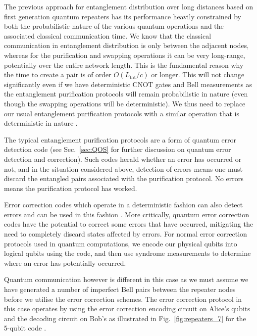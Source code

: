 \documentclass[twocolumn, aps, rmp, amsmath, amssymb, nofootinbib, superscriptaddress, longbibliography, floatfix, table-of-contents, eqsecnum]{revtex4-1}
\begin{document}
The previous approach for entanglement distribution over long distances based on first generation quantum repeaters has its performance heavily constrained by both the probabilistic nature of the various quantum operations and the associated classical communication time. We know that the classical communication in entanglement distribution is only between the adjacent nodes, whereas for the purification and swapping operations it can be very long-range, potentially over the entire network length. This is the fundamental reason why the time to create a pair is of order $O(L_\mathrm{tot}/c)$ or longer. This will not change significantly even if we have deterministic CNOT gates and Bell measurements as the entanglement purification protocols will remain probabilistic in nature (even though the swapping operations will be deterministic). We thus need to replace our usual entanglement purification protocols with a similar operation that is deterministic in nature \cite{bib:jiang09, bib:munro10}.

The typical entanglement purification protocols are a form of quantum error detection code \cite{bib:WJM2015, bib:devitt2013} (see Sec.~\ref{sec:QOS} for further discussion on quantum error detection and correction). Such codes herald whether an error has occurred or not, and in the situation considered above, detection of errors means one must discard the entangled pairs associated with the purification protocol. No errors means the purification protocol has worked.

Error correction codes which operate in a deterministic fashion can also detect errors and can be used in this fashion \cite{bib:jiang09, bib:munro10}. More critically, quantum error correction codes have the potential to correct some errors that have occurred, mitigating the need to completely discard states affected by errors. For normal error correction protocols used in quantum computations, we encode our physical qubits into logical qubits using the code, and then use syndrome measurements to determine where an error has potentially occurred.

Quantum communication however is different in this case as we must assume we have generated a number of imperfect Bell pairs between the repeater nodes before we utilise the error correction schemes. The error correction protocol in this case operates by using the error correction encoding circuit on Alice's qubits and the decoding circuit on Bob's \cite{bib:Aschauer2004} as illustrated in Fig.~\ref{fig:repeaters_7} for the 5-qubit code \cite{bib:Bennettr1996a, bib:Knill97}.
\end{document}
